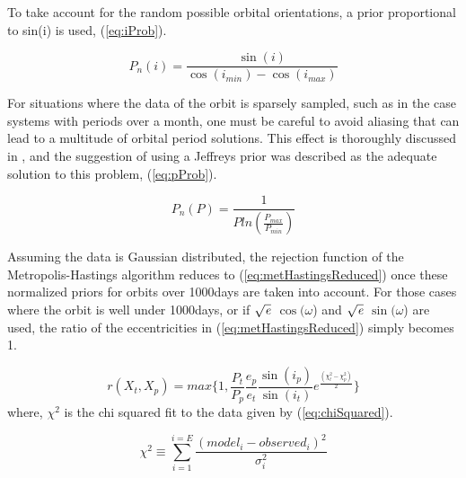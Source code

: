 \documentclass[12pt,preprint]{aastex}
\begin{document}
 
To take account for the random possible orbital orientations, a prior proportional to sin(i) is used, (\ref{eq:iProb}).

\begin{equation}\label{eq:iProb}
P_n(i) =  \frac{\sin(i)}{\cos(i_{min})-\cos(i_{max})}
\end{equation}

For situations where the data of the orbit is sparsely sampled, such as in the case systems with periods over a month, one must be careful to avoid aliasing that can lead to a multitude of orbital period solutions.  This effect is thoroughly discussed in \citet{gregory2005}, and the suggestion of using a Jeffreys prior was described as the adequate solution to this problem, (\ref{eq:pProb}).

\begin{equation}\label{eq:pProb}
P_n(P) =  \frac{1}{P ln(\frac{P_{max}}{P_{min}})}
\end{equation}

Assuming the data is Gaussian distributed, the rejection function of the Metropolis-Hastings algorithm reduces to (\ref{eq:metHastingsReduced}) once these normalized priors for orbits over 1000days are taken into account.  For those cases where the orbit is well under 1000days, or if $\sqrt{{\it e}}$ $\cos(\omega$) and $\sqrt{{\it e}}$ $\sin(\omega$) are used, the ratio of the eccentricities in (\ref{eq:metHastingsReduced}) simply becomes 1.

\begin{equation}\label{eq:metHastingsReduced}
r(X_t,X_p) = max\bigg\{1, \frac{P_t}{P_p}\frac{e_p}{e_t}\frac{\sin(i_p)}{\sin(i_t)}e^{\frac{(\chi^2_t - \chi^2_p)}{2}} \bigg\}
\end{equation}
where, $\chi^2$ is the chi squared fit to the data given by (\ref{eq:chiSquared}).

\begin{equation}\label{eq:chiSquared}
{\chi}^{2} \equiv  \sum_{i=1}^{i=E} \frac{(model_i - observed_i)^{2}}{\sigma^{2}_i}
\end{equation}


\pagebreak
\end{document}
